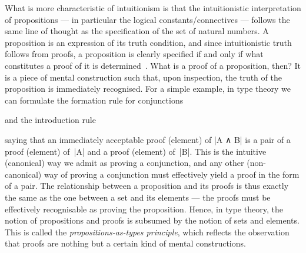 What is more characteristic of intuitionism is that the intuitionistic interpretation of propositions --- in particular the logical constants/connectives --- follows the same line of thought as the specification of the set of natural numbers.
A proposition is an expression of its truth condition, and since intuitionistic truth follows from proofs, a proposition is clearly specified if and only if what constitutes a proof of it is determined~\citep{ML-truth-of-a-proposition}.
What is a proof of a proposition, then? It is a piece of mental construction such that, upon inspection, the truth of the proposition is immediately recognised.
For a simple example, in type theory we can formulate the formation rule for conjunctions
\begin{center}
 \DP
\end{center}
and the introduction rule
\begin{center}
   \DP
\end{center}
saying that an immediately acceptable proof (element) of |A ∧ B| is a pair of a proof (element) of~|A| and a proof (element) of~|B|.
This is the intuitive (canonical) way we admit as proving a conjunction, and any other (non-canonical) way of proving a conjunction must effectively yield a proof in the form of a pair.
The relationship between a proposition and its proofs is thus exactly the same as the one between a set and its elements --- the proofs must be effectively recognisable as proving the proposition.
Hence, in type theory, the notion of propositions and proofs is subsumed by the notion of sets and elements.
This is called the \emph{propositions-as-types principle}, which reflects the observation that proofs are nothing but a certain kind of mental constructions.

